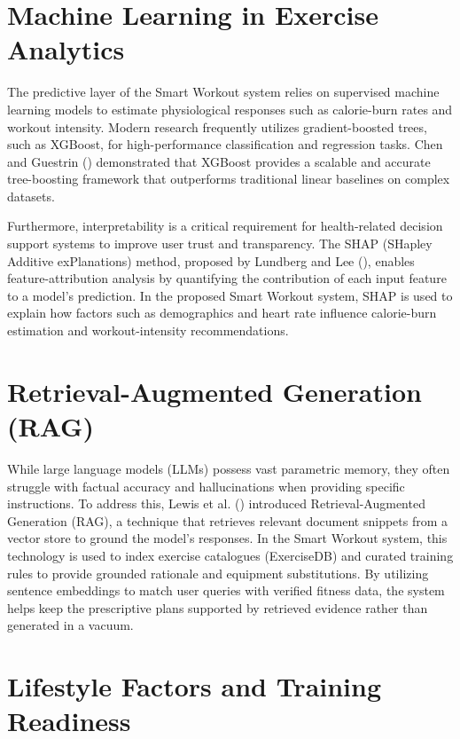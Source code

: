 \documentclass{aitthesis}
\begin{document}
\section{Machine Learning in Exercise Analytics}

The predictive layer of the Smart Workout system relies on supervised machine learning models to estimate physiological responses such as calorie-burn rates and workout intensity. Modern research frequently utilizes gradient-boosted trees, such as XGBoost, for high-performance classification and regression tasks. Chen and Guestrin (\citeyear{chen2016}) demonstrated that XGBoost provides a scalable and accurate tree-boosting framework that outperforms traditional linear baselines on complex datasets.

Furthermore, interpretability is a critical requirement for health-related decision support systems to improve user trust and transparency. The SHAP (SHapley Additive exPlanations) method, proposed by Lundberg and Lee (\citeyear{lundberg2017}), enables feature-attribution analysis by quantifying the contribution of each input feature to a model's prediction. In the proposed Smart Workout system, SHAP is used to explain how factors such as demographics and heart rate influence calorie-burn estimation and workout-intensity recommendations.

\section{Retrieval-Augmented Generation (RAG)}

While large language models (LLMs) possess vast parametric memory, they often struggle with factual accuracy and hallucinations when providing specific instructions. To address this, Lewis et al. (\citeyear{lewis2020}) introduced Retrieval-Augmented Generation (RAG), a technique that retrieves relevant document snippets from a vector store to ground the model's responses. In the Smart Workout system, this technology is used to index exercise catalogues (ExerciseDB) and curated training rules to provide grounded rationale and equipment substitutions. By utilizing sentence embeddings to match user queries with verified fitness data, the system helps keep the prescriptive plans supported by retrieved evidence rather than generated in a vacuum.

\section{Lifestyle Factors and Training Readiness}
\end{document}
